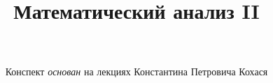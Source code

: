 \documentclass[12pt, a4paper, oneside]{book}
\title{\textbf{Математический анализ II}}
\author{
\\
\\
Конспект \textit{основан} на лекциях Константина Петровича Кохася}
\date{}
\begin{document}
\maketitle
\mainmatter
\tableofcontents
\pagebreak

\end{document}
